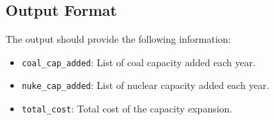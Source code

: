 \documentclass{article}
\begin{document}
\subsection*{Output Format}
The output should provide the following information:
\begin{itemize}
    \item \texttt{coal\_cap\_added}: List of coal capacity added each year.
    \item \texttt{nuke\_cap\_added}: List of nuclear capacity added each year.
    \item \texttt{total\_cost}: Total cost of the capacity expansion.
\end{itemize}
\end{document}

